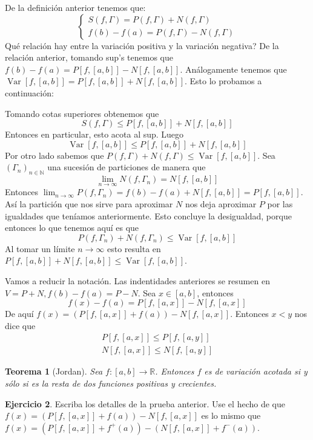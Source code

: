 \documentclass[12pt]{article}
\theoremstyle{plain}
\newtheorem{Th}{Teorema}[subsection]   %
\theoremstyle{definition}
\newtheorem{Ej}[Th]{Ejercicio}
\theoremstyle{remark}
\numberwithin{equation}{section}
\DeclareMathOperator{\Var}{Var}     %
\newcommand{\bN}{\mathbb{N}}        %
\newcommand{\bR}{\mathbb{R}}        %
\renewcommand{\leq}{\leqslant}      %
\renewcommand{\:}{\colon}           %
\newcommand{\bonj}[1]{\left\lbrack#1\right\rbrack}
\begin{document}
\begin{multicols}{2}
De la definición anterior tenemos que:
$$
\begin{cases}
  S(f,\Gamma)=P(f,\Gamma)+N(f,\Gamma) \\
  f(b)-f(a)=P(f,\Gamma)-N(f,\Gamma)
\end{cases}
$$
Qué relación hay entre la variación positiva y la variación negativa? De la relación anterior, tomando sup's tenemos que $f(b)-f(a)=P\bonj{f,\bonj{a,b}}-N\bonj{f,\bonj{a,b}}$. Análogamente tenemos que $\Var\bonj{f,\bonj{a,b}}=P\bonj{f,\bonj{a,b}}+N\bonj{f,\bonj{a,b}}$. Esto lo probamos a continuación:
\begin{ptcbp}
Tomando cotas superiores obtenemos que
$$S(f,\Gamma)\leq P\bonj{f,\bonj{a,b}}+N\bonj{f,\bonj{a,b}}$$
Entonces en particular, esto acota al sup. Luego
$$\Var\bonj{f,\bonj{a,b}}\leq P\bonj{f,\bonj{a,b}}+N\bonj{f,\bonj{a,b}}$$
Por otro lado sabemos que $P(f,\Gamma)+N(f,\Gamma)\leq\Var\bonj{f,\bonj{a,b}}$. Sea $(\Gamma_n)_{n\in\bN}$ una sucesión de particiones de manera que
$$\lim_{n\to\infty}N(f,\Gamma_n)=N\bonj{f,\bonj{a,b}}$$
Entonces $\lim_{n\to\infty}P(f,\Gamma_n)=f(b)-f(a)+N\bonj{f,\bonj{a,b}}=P\bonj{f,\bonj{a,b}}$. Así la partición que nos sirve para aproximar $N$ nos deja aproximar $P$ por las igualdades que teníamos anteriormente. Esto concluye la desigualdad, porque entonces lo que tenemos aquí es que
$$P(f,\Gamma_n)+N(f,\Gamma_n)\leq\Var\bonj{f,\bonj{a,b}}$$
Al tomar un límite $n\to\infty$ esto resulta en $P\bonj{f,\bonj{a,b}}+N\bonj{f,\bonj{a,b}}\leq\Var\bonj{f,\bonj{a,b}}$.
\end{ptcbp}

Vamos a reducir la notación. Las indentidades anteriores se resumen en $V=P+N, f(b)-f(a)=P-N$. Sea $x\in\bonj{a,b}$, entonces
$$f(x)-f(a)=P\bonj{f,\bonj{a,x}}-N\bonj{f,\bonj{a,x}}$$
De aquí $f(x)=\left(P\bonj{f,\bonj{a,x}}+f(a)\right)-N\bonj{f,\bonj{a,x}}$. Entonces $x<y$ nos dice que
\begin{gather*}
  P\bonj{f,\bonj{a,x}}\leq P\bonj{f,\bonj{a,y}} \\
  N\bonj{f,\bonj{a,x}}\leq N\bonj{f,\bonj{a,y}}
\end{gather*}
\begin{Th}[Jordan]\label{thm:thm:BV2monotJordan}
  Sea $f\colon\bonj{a,b}\to\bR$. Entonces $f$ es de variación acotada si y sólo si es la resta de dos funciones positivas y crecientes.
\end{Th}

\begin{Ej}
  Escriba los detalles de la prueba anterior. Use el hecho de que $f(x)=\left(P\bonj{f,\bonj{a,x}}+f(a)\right)-N\bonj{f,\bonj{a,x}}$ es lo mismo que $f(x)=\left(P\bonj{f,\bonj{a,x}}+f^+(a)\right)-\left(N\bonj{f,\bonj{a,x}}+f^-(a)\right)$.
\end{Ej}


\end{multicols}
\end{document}
